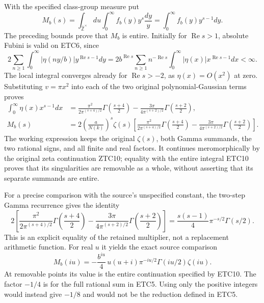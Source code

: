 \documentclass[11pt]{article}
\begin{document}
With the specified class-group measure put
\begin{equation}\tag{ETC10}
 M_b(s)=\int_{\widehat{\mathbb Z}^{\times}}du
            \int_0^\infty f_b(y)y^s\frac{dy}{y}
       =\int_0^\infty f_b(y)y^{s-1}dy.
\end{equation}
The preceding bounds prove that $M_b$ is entire. Initially for
$\operatorname{Re}s>1$, absolute Fubini is valid on ETC6, since
\[
 2\sum_{n\ge1}\int_0^\infty
    |\eta(ny/b)|y^{\operatorname{Re}s-1}dy
 =2b^{\operatorname{Re}s}\sum_{n\ge1}n^{-\operatorname{Re}s}
        \int_0^\infty|\eta(x)|x^{\operatorname{Re}s-1}dx<\infty.
\]
The local integral converges already for $\operatorname{Re}s>-2$,
as $\eta(x)=O(x^2)$ at zero. Substituting $v=\pi x^2$ into
each of the two original polynomial-Gaussian terms proves
\begin{equation}\tag{ETC11}
 \begin{split}
 \int_0^\infty\eta(x)x^{s-1}dx
 &=\frac{\pi^2}{2\pi^{(s+4)/2}}
       \Gamma\left(\frac{s+4}{2}\right)
   -\frac{3\pi}{4\pi^{(s+2)/2}}
       \Gamma\left(\frac{s+2}{2}\right),\\
 M_b(s)
 &=2\left(\frac a{N(k)}\right)^s\zeta(s)
   \left[
     \frac{\pi^2}{2\pi^{(s+4)/2}}
       \Gamma\left(\frac{s+4}{2}\right)
    -\frac{3\pi}{4\pi^{(s+2)/2}}
       \Gamma\left(\frac{s+2}{2}\right)
   \right].
 \end{split}
\end{equation}
The working expression keeps the original $\zeta(s)$, both Gamma
summands, the two rational signs, and all finite and real factors.
It continues meromorphically by the original zeta continuation
ZTC10; equality with the entire integral ETC10 proves that its
singularities are removable as a whole, without asserting that its
separate summands are entire.

For a precise comparison with the source's unspecified constant,
the two-step Gamma recurrence gives the identity
\begin{equation}\tag{ETC12}
 2\left[
     \frac{\pi^2}{2\pi^{(s+4)/2}}\Gamma\left(\frac{s+4}{2}\right)
    -\frac{3\pi}{4\pi^{(s+2)/2}}\Gamma\left(\frac{s+2}{2}\right)
 \right]
 =\frac{s(s-1)}4\pi^{-s/2}\Gamma(s/2).
\end{equation}
This is an explicit equality of the retained multiplier, not a
replacement arithmetic function. For real $u$ it yields the exact
source comparison
\begin{equation}\tag{ETC13}
 M_b(iu)=-\frac{b^{iu}}4\,u(u+i)
                   \pi^{-iu/2}\Gamma(iu/2)\zeta(iu).
\end{equation}
At removable points its value is the entire continuation specified
by ETC10. The factor $-1/4$ is for the full rational sum in ETC5.
Using only the positive integers would instead give $-1/8$ and
would not be the reduction defined in ETC5.
\end{document}
